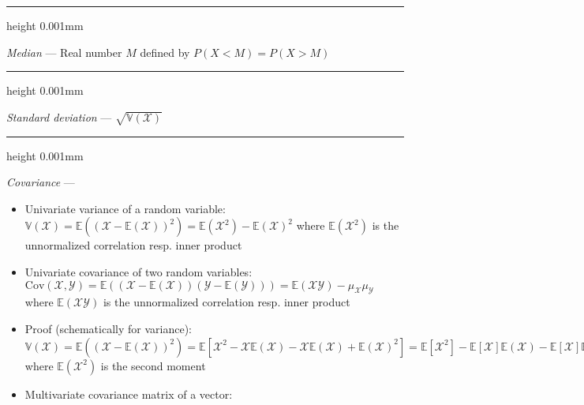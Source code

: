 {\color{lightgray}\hrule height 0.001mm}

\emph{Median} --- Real number $M$ defined by $P(X<M) = P(X>M)$

{\color{lightgray}\hrule height 0.001mm}

\emph{Standard deviation} --- $\sqrt{\mathbb{V}(\mathcal{X})}$

{\color{lightgray}\hrule height 0.001mm}

\emph{Covariance} ---
\begin{itemize}
    \item Univariate variance of a random variable: $\mathbb{V}(\mathcal{X}) = \mathbb{E}((\mathcal{X}-\mathbb{E}(\mathcal{X}))^2) = \mathbb{E}(\mathcal{X}^2) - \mathbb{E}(\mathcal{X})^2$ where $\mathbb{E}(\mathcal{X}^2)$ is the unnormalized correlation resp. inner product
    \item Univariate covariance of two random variables: $\textrm{Cov}(\mathcal{X}, \mathcal{Y}) = \mathbb{E}((\mathcal{X}-\mathbb{E}(\mathcal{X}))(\mathcal{Y}-\mathbb{E}(\mathcal{Y}))) = \mathbb{E}(\mathcal{X}\mathcal{Y}) - \mu_{\mathcal{X}} \mu_{\mathcal{Y}}$ where $\mathbb{E}(\mathcal{X}\mathcal{Y})$ is the unnormalized correlation resp. inner product
    \item Proof (schematically for variance): $\mathbb{V}(\mathcal{X}) = \mathbb{E}((\mathcal{X}-\mathbb{E}(\mathcal{X}))^2) = \mathbb{E}[ \mathcal{X}^2 - \mathcal{X}\mathbb{E}(\mathcal{X}) - \mathcal{X}\mathbb{E}(\mathcal{X}) + \mathbb{E}(\mathcal{X})^2 ] = \mathbb{E}[ \mathcal{X}^2] - \mathbb{E}[\mathcal{X}]\mathbb{E}(\mathcal{X}) - \mathbb{E}[\mathcal{X}]\mathbb{E}(\mathcal{X}) + \mathbb{E}(\mathcal{X})^2 = \mathbb{E}(\mathcal{X}^2) - \mathbb{E}(\mathcal{X})^2$ where $\mathbb{E}(\mathcal{X}^2)$ is the second moment
    \item Multivariate covariance matrix of a vector: 
\end{itemize}
